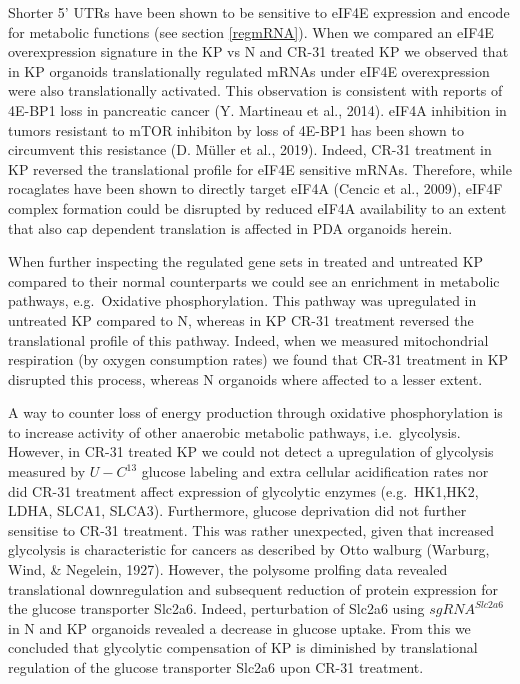 \documentclass[12pt,openany]{book}
\begin{document}
Shorter 5' UTRs have been shown to be sensitive to eIF4E expression and
encode for metabolic functions (see section \ref{regmRNA}). When we
compared an eIF4E overexpression signature in the KP vs N and CR-31
treated KP we observed that in KP organoids translationally regulated
mRNAs under eIF4E overexpression were also translationally activated.
This observation is consistent with reports of 4E-BP1 loss in pancreatic
cancer (Y. Martineau et al., 2014). eIF4A inhibition in tumors resistant
to mTOR inhibiton by loss of 4E-BP1 has been shown to circumvent this
resistance (D. Müller et al., 2019). Indeed, CR-31 treatment in KP
reversed the translational profile for eIF4E sensitive mRNAs. Therefore,
while rocaglates have been shown to directly target eIF4A (Cencic et
al., 2009), eIF4F complex formation could be disrupted by reduced eIF4A
availability to an extent that also cap dependent translation is
affected in PDA organoids herein.

When further inspecting the regulated gene sets in treated and untreated
KP compared to their normal counterparts we could see an enrichment in
metabolic pathways, e.g.~Oxidative phosphorylation. This pathway was
upregulated in untreated KP compared to N, whereas in KP CR-31 treatment
reversed the translational profile of this pathway. Indeed, when we
measured mitochondrial respiration (by oxygen consumption rates) we
found that CR-31 treatment in KP disrupted this process, whereas N
organoids where affected to a lesser extent.

A way to counter loss of energy production through oxidative
phosphorylation is to increase activity of other anaerobic metabolic
pathways, i.e.~glycolysis. However, in CR-31 treated KP we could not
detect a upregulation of glycolysis measured by \(U-C^{13}\) glucose
labeling and extra cellular acidification rates nor did CR-31 treatment
affect expression of glycolytic enzymes (e.g.~HK1,HK2, LDHA, SLCA1,
SLCA3). Furthermore, glucose deprivation did not further sensitise to
CR-31 treatment. This was rather unexpected, given that increased
glycolysis is characteristic for cancers as described by Otto walburg
(Warburg, Wind, \& Negelein, 1927). However, the polysome prolfing data
revealed translational downregulation and subsequent reduction of
protein expression for the glucose transporter Slc2a6. Indeed,
perturbation of Slc2a6 using \(sgRNA^{Slc2a6}\) in N and KP organoids
revealed a decrease in glucose uptake. From this we concluded that
glycolytic compensation of KP is diminished by translational regulation
of the glucose transporter Slc2a6 upon CR-31 treatment.
\end{document}
